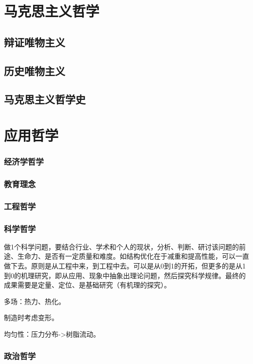 \documentclass[UTF8]{../RepresentationUniverse}
\begin{document}
\chapter{马克思主义哲学}
    \section{辩证唯物主义}
    \section{历史唯物主义}
    \section{马克思主义哲学史}




\chapter{应用哲学}
    \subsection{经济学哲学}
    \subsection{教育理念}
    \subsection{工程哲学}
    \subsection{科学哲学}

    做1个科学问题，要结合行业、学术和个人的现状，分析、判断、研讨该问题的前途、生命力、是否有一定质量和难度。如结构优化在于减重和提高性能，可以一直做下去。原则是从工程中来，到工程中去。可以是从0到1的开拓，但更多的是从1到0的机理研究，即从应用、现象中抽象出理论问题，然后探究科学规律。最终的成果需要是定量、定位、是基础研究（有机理的探究）。

    多场：热力、热化。

    制造时考虑变形。

    均匀性：压力分布->树脂流动。




    \subsection{政治哲学}
\end{document}
